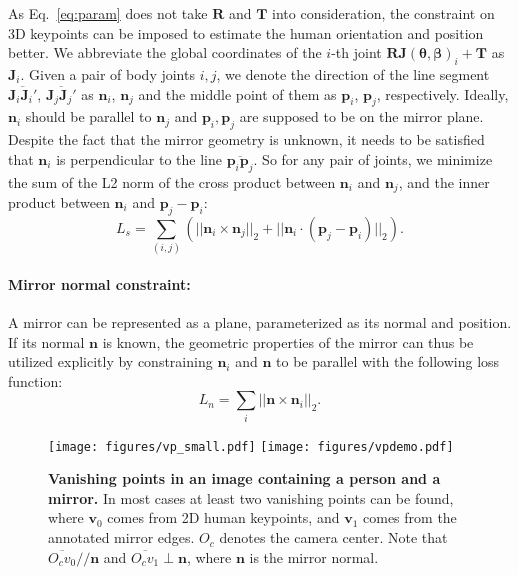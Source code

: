 As Eq.~\ref{eq:param} does not take $\bm R$ and $\bm{T}$ into consideration, the constraint on 3D keypoints can be imposed to estimate the human orientation and position better. We abbreviate the global coordinates of the $i$-th joint $\bm{R}\bm{J}(\bm\theta, \bm\beta)_i + \bm{T}$ as $\bm{J}_i$. Given a pair of body joints $i, j$, we denote the direction of the line segment $\overline{\bm{J}_i\bm{J}_i'}$, $\overline{\bm{J}_j\bm{J}_j'}$ as $\bm{n}_i$, $\bm{n}_j$ and the middle point of them as $\bm p_i$, $\bm p_j$, respectively. Ideally, $\bm n_i$ should be parallel to $\bm n_j$ and $\bm p_i, \bm{p}_j$ are supposed to be on the mirror plane. Despite the fact that the mirror geometry is unknown, it needs to be satisfied that $\bm{n}_i$ is perpendicular to the line  $\overline{\bm{p}_i\bm{p}_j}$. So for 
any pair of joints, we minimize the sum of the L2 norm of the cross product between $\bm{n}_i$ and $\bm{n}_j$, and the inner product between $\bm{n}_i$ and $\bm{p}_j - \bm{p}_i$: 
\begin{equation}\label{eq:mirrorsym}
    L_{s} = \sum_{(i, j)}(||\bm{n}_i \times \bm{n}_j||_2 + || \bm{n}_i\cdot (\bm{p}_j - \bm{p}_i) ||_2).
\end{equation}

\paragraph{Mirror normal constraint:}
A mirror can be represented as a plane, parameterized as its normal and position. If its normal $\bm{n}$ is known, the geometric properties of the mirror can thus be utilized explicitly by constraining $\bm n_i$ and $\bm n$ to be parallel with the following loss function:
\begin{equation}\label{eq:mirrorgt}
    L_{n} =  \sum_i||\bm{n} \times \bm{n}_i||_2. 
\end{equation}
\vspace{-0.5cm}
\begin{figure}[t]
	\centering
	\texttt{[image: figures/vp\_small.pdf]}
	\texttt{[image: figures/vpdemo.pdf]}
	\vspace{-0.8cm}
	\caption{\textbf{Vanishing points in an image containing a person and a mirror.} In most cases at least two vanishing points can be found, where $\bm v_0$ comes from 2D human keypoints, and $\bm v_1$ comes from the annotated mirror edges. $O_c$ denotes the camera center. Note that $\overline{O_c v_0} // \bm n$ and $\overline{O_c v_1} \perp \bm n$, where $\bm n$ is the mirror normal.
	}
	\label{fig:vp}
\end{figure}
